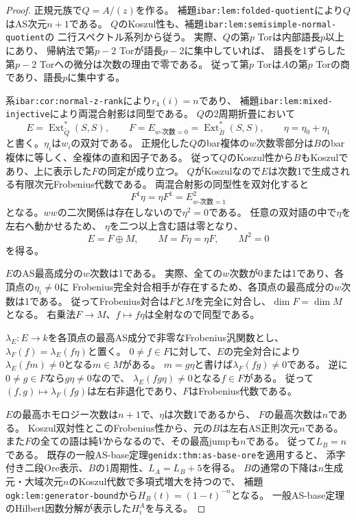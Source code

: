 \documentclass[11pt,a4paper]{ltjsarticle}
\begin{document}
\begin{proof}
正規元族で$Q=A/(z)$を作る。
補題\texttt{ibar:lem:folded-quotient}により$Q$はAS次元$n+1$である。
$Q$のKoszul性も、補題\texttt{ibar:lem:semisimple-normal-quotient}の
二行スペクトル系列から従う。
実際、$Q$の第$p$ Torは内部語長$p$以上にあり、
帰納法で第$p-2$ Torが語長$p-2$に集中していれば、
語長を1ずらした第$p-2$ Torへの微分は次数の理由で零である。
従って第$p$ Torは$A$の第$p$ Torの商であり、語長$p$に集中する。

系\texttt{ibar:cor:normal-z-rank}により$r_4(i)=n$であり、
補題\texttt{ibar:lem:mixed-injective}により両混合射影は同型である。
$Q$の2周期折畳において
\[
E=\operatorname{Ext}_{\widetilde Q}^*(S,S),\qquad
F=E_{w\text{-次数}=0}
  =\operatorname{Ext}_{\widetilde B}^*(S,S),\qquad
\eta=\eta_0+\eta_1
\]
と書く。$\eta_i$は$w_i$の双対である。
正規化した$Q$のbar複体の$w$次数零部分は$B$のbar複体に等しく、全複体の直和因子である。
従って$Q$のKoszul性から$B$もKoszulであり、上に表示した$F$の同定が成り立つ。
$Q$がKoszulなので$E$は次数1で生成される有限次元Frobenius代数である。
両混合射影の同型性を双対化すると
\[
F^1\eta=\eta F^1=E^2_{w\text{-次数}=1}
\]
となる。$ww$の二次関係は存在しないので$\eta^2=0$である。
任意の双対語の中で$\eta$を左右へ動かせるため、
$\eta$を二つ以上含む語は零となり、
\[
E=F\oplus M,\qquad M=F\eta=\eta F,\qquad M^2=0
\]
を得る。

$E$のAS最高成分の$w$次数は1である。
実際、全ての$w$次数が0または1であり、各頂点の$\eta_i\ne0$に
Frobenius完全対合相手が存在するため、各頂点の最高成分の$w$次数は1である。
従ってFrobenius対合は$F$と$M$を完全に対合し、$\dim F=\dim M$となる。
右乗法$F\to M$、$f\mapsto f\eta$は全射なので同型である。

$\lambda_E:E\to k$を各頂点の最高AS成分で非零なFrobenius汎関数とし、
$\lambda_F(f)=\lambda_E(f\eta)$と置く。
$0\ne f\in F$に対して、$E$の完全対合により
$\lambda_E(fm)\ne0$となる$m\in M$がある。
$m=g\eta$と書けば$\lambda_F(fg)\ne0$である。
逆に$0\ne g\in F$なら$g\eta\ne0$なので、
$\lambda_E(fg\eta)\ne0$となる$f\in F$がある。
従って$(f,g)\mapsto\lambda_F(fg)$は左右非退化であり、$F$はFrobenius代数である。

$E$の最高ホモロジー次数は$n+1$で、$\eta$は次数1であるから、
$F$の最高次数は$n$である。
Koszul双対性とこのFrobenius性から、元の$B$は左右AS正則次元$n$である。
また$F$の全ての語は純$V$からなるので、その最高jumpも$n$である。
従って$L_B=n$である。
既存の一般AS-base定理\texttt{genidx:thm:as-base-ore}を適用すると、
添字付き二段Ore表示、$B$の1周期性、$L_A=L_B+5$を得る。
$B$の通常の下降は$n$生成元・大域次元$n$のKoszul代数で多項式増大を持つので、
補題\texttt{ogk:lem:generator-bound}から$H_B(t)=(1-t)^{-n}$となる。
一般AS-base定理のHilbert因数分解が表示した$H_i^A$を与える。
\end{proof}
\end{document}
